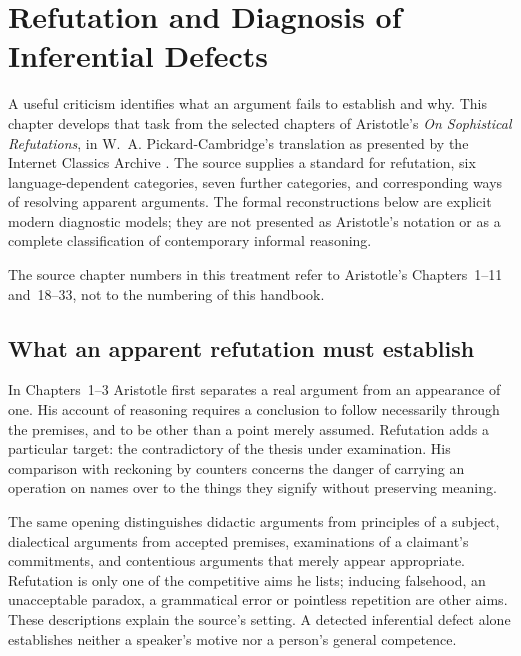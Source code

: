 \chapter{Refutation and Diagnosis of Inferential Defects}
\label{sec:p18-refutation-diagnosis}

A useful criticism identifies what an argument fails to establish and why.
This chapter develops that task from the selected chapters of Aristotle's
\emph{On Sophistical Refutations}, in W.~A. Pickard-Cambridge's translation
as presented by the Internet Classics Archive
\cite{AristotleSophisticalRefutationsPickardCambridgeMIT}.
The source supplies a standard for refutation, six language-dependent
categories, seven further categories, and corresponding ways of resolving
apparent arguments. The formal reconstructions below are explicit modern
diagnostic models; they are not presented as Aristotle's notation or as
a complete classification of contemporary informal reasoning.

The source chapter numbers in this treatment refer to Aristotle's
Chapters~1--11 and~18--33, not to the numbering of this handbook.

\section{What an apparent refutation must establish}

In Chapters~1--3 Aristotle first separates a real argument from an
appearance of one. His account of reasoning requires a conclusion to
follow necessarily through the premises, and to be other than a point
merely assumed. Refutation adds a particular target: the contradictory
of the thesis under examination. His comparison with reckoning by
counters concerns the danger of carrying an operation on names over
to the things they signify without preserving meaning.

The same opening distinguishes didactic arguments from principles of
a subject, dialectical arguments from accepted premises, examinations
of a claimant's commitments, and contentious arguments that merely
appear appropriate. Refutation is only one of the competitive aims he
lists; inducing falsehood, an unacceptable paradox, a grammatical error
or pointless repetition are other aims. These descriptions explain
the source's setting. A detected inferential defect alone establishes
neither a speaker's motive nor a person's general competence.

